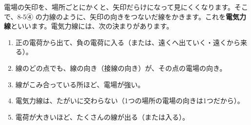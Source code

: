 \label{ph:電-1:sec5}
電場の矢印を、場所ごとにかくと、矢印だらけになって見にくくなります。そこで、8-5④ の力線のように、矢印の向きをつないだ線をかきます。これを\textbf{電気力線}といいます。電気力線には、次の決まりがあります。
\begin{enumerate}[label={\bkcircled{\arabic*}}, leftmargin=2.4\zw, itemsep=1pt, topsep=2pt]
\item 正の電荷から出て、負の電荷に入る（または、遠くへ出ていく・遠くから来る）。
\item 線のどの点でも、線の向き（接線の向き）が、その点の電場の向き。
\item 線がこみ合っている所ほど、電場が強い。
\item 電気力線は、たがいに交わらない（1つの場所の電場の向きは1つだから）。
\item 電荷が大きいほど、たくさんの線が出る（または入る）。
\end{enumerate}

